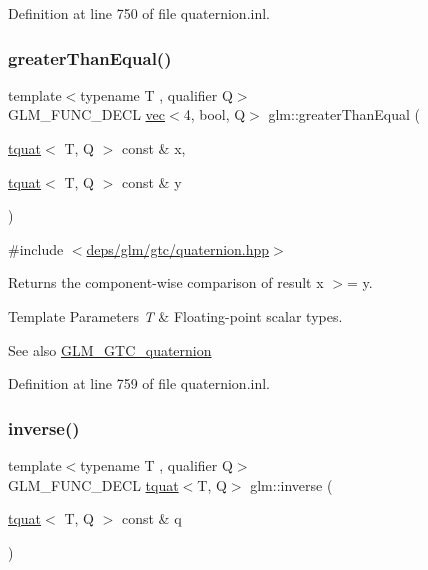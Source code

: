 Definition at line 750 of file quaternion.\+inl.

\mbox{\label{group__gtc__quaternion_ga293cb3175d9ad290deaf50984716fd44}} 
\subsubsection{\texorpdfstring{greater\+Than\+Equal()}{greaterThanEqual()}}
{\footnotesize\ttfamily template$<$typename T , qualifier Q$>$ \\
G\+L\+M\+\_\+\+F\+U\+N\+C\+\_\+\+D\+E\+CL \hyperlink{structglm_1_1vec}{vec}$<$4, bool, Q$>$ glm\+::greater\+Than\+Equal (\begin{DoxyParamCaption}\item[{\hyperlink{structglm_1_1tquat}{tquat}$<$ T, Q $>$ const \&}]{x,  }\item[{\hyperlink{structglm_1_1tquat}{tquat}$<$ T, Q $>$ const \&}]{y }\end{DoxyParamCaption})}



{\ttfamily \#include $<$\hyperlink{gtc_2quaternion_8hpp}{deps/glm/gtc/quaternion.\+hpp}$>$}

Returns the component-\/wise comparison of result x $>$= y.


\begin{DoxyTemplParams}{Template Parameters}
{\em T} & Floating-\/point scalar types.\\
\hline
\end{DoxyTemplParams}
\begin{DoxySeeAlso}{See also}
\hyperlink{group__gtc__quaternion}{G\+L\+M\+\_\+\+G\+T\+C\+\_\+quaternion} 
\end{DoxySeeAlso}


Definition at line 759 of file quaternion.\+inl.

\mbox{\label{group__gtc__quaternion_gadc59b59ce71daa5586a64a6acf36c072}} 
\subsubsection{\texorpdfstring{inverse()}{inverse()}}
{\footnotesize\ttfamily template$<$typename T , qualifier Q$>$ \\
G\+L\+M\+\_\+\+F\+U\+N\+C\+\_\+\+D\+E\+CL \hyperlink{structglm_1_1tquat}{tquat}$<$T, Q$>$ glm\+::inverse (\begin{DoxyParamCaption}\item[{\hyperlink{structglm_1_1tquat}{tquat}$<$ T, Q $>$ const \&}]{q }\end{DoxyParamCaption})}



